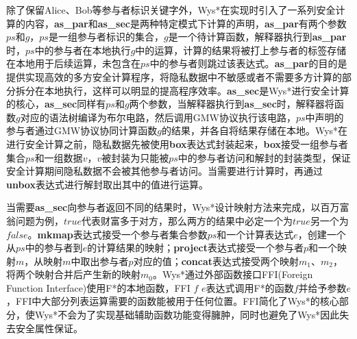 除了保留Alice、Bob等参与者标识关键字外，Wys*在实现时引入了一系列安全计算的内容，\textbf{as\_par}和\textbf{as\_sec}是两种特定模式下计算的声明，\textbf{as\_par}有两个参数$ps$和$g$，$ps$是一组参与者标识的集合，$g$是一个待计算函数，解释器执行到\textbf{as\_par}时，$ps$中的参与者在本地执行$g$中的运算，计算的结果将被打上参与者的标签存储在本地用于后续运算，未包含在$ps$中的参与者则跳过该表达式。\textbf{as\_par}的目的是提供实现高效的多方安全计算程序，将隐私数据中不敏感或者不需要多方计算的部分拆分在本地执行，这样可以明显的提高程序效率。\textbf{as\_sec}是Wys*进行安全计算的核心，\textbf{as\_sec}同样有$ps$和$g$两个参数，当解释器执行到\textbf{as\_sec}时，解释器将函数$g$对应的语法树编译为布尔电路，然后调用GMW协议执行该电路，$ps$中声明的参与者通过GMW协议协同计算函数$g$的结果，并各自将结果存储在本地。Wys*在进行安全计算之前，隐私数据先被使用\textbf{box}表达式封装起来，\textbf{box}接受一组参与者集合$ps$和一组数据$v$，$v$被封装为只能被$ps$中的参与者访问和解封的封装类型，保证安全计算期间隐私数据不会被其他参与者访问。当需要进行计算时，再通过\textbf{unbox}表达式进行解封取出其中的值进行运算。 

当需要\textbf{as\_sec}向参与者返回不同的结果时，Wys*设计映射方法来完成，以百万富翁问题为例，$true$代表财富多于对方，那么两方的结果中必定一个为$true$另一个为$false$。\textbf{mkmap}表达式接受一个参与者集合参数$ps$和一个计算表达式$e$，创建一个从$ps$中的参与者到$e$的计算结果的映射；\textbf{project}表达式接受一个参与者$p$和一个映射$m$，从映射$m$中取出参与者$p$对应的值；\textbf{concat}表达式接受两个映射$m_1$、$m_2$，将两个映射合并后产生新的映射$m_0$。Wys*通过外部函数接口FFI(Foreign Function Interface)使用F*的本地函数，FFI $f$ $e$表达式调用F*的函数$f$并给予参数$e$，FFI中大部分列表运算需要的函数能被用于任何位置。FFI简化了Wys*的核心部分，使Wys*不会为了实现基础辅助函数功能变得臃肿，同时也避免了Wys*因此失去安全属性保证。



